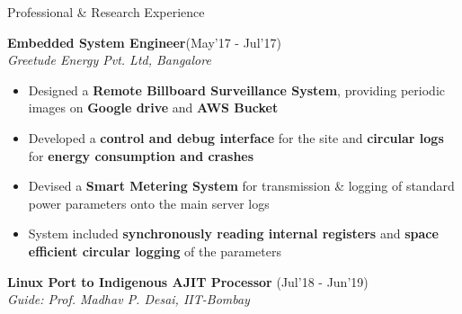 \documentclass{resume}
\newcommand{\sepval}{-0.5em}
\begin{document}

\begin{rSection}{Professional \& Research Experience}

\vspace{-.4cm}
 
\item{\bf {\bf Embedded System Engineer}}\hfill{(May'17 - Jul'17)}\\ \emph{Greetude Energy Pvt. Ltd, Bangalore}\\
[-0.4cm]
  
\begin{itemize}[leftmargin=*]
    
	\itemsep \sepval
 
	
	\item Designed a {\bf Remote Billboard Surveillance System}, providing periodic images on {\bf Google drive} and {\bf AWS Bucket}
	 
	\item Developed a {\bf control and debug interface} for the site and {\bf circular logs} for {\bf energy consumption and crashes}

	\item Devised a {\bf Smart Metering System} for transmission \& logging of standard power parameters onto the main server logs
 
	\item System included {\bf synchronously reading internal registers} and {\bf space efficient circular logging} of the parameters
	      
 
\end{itemize}

\vspace{-0.1cm}
\item {\bf{Linux Port to Indigenous AJIT Processor}} \hfill {(Jul'18 - Jun'19)}\\

\emph{Guide: Prof. Madhav P. Desai, IIT-Bombay}\\
[-0.6cm]

\begin{itemize}[leftmargin=*]
		

\end{itemize}
\end{rSection}
\end{document}
